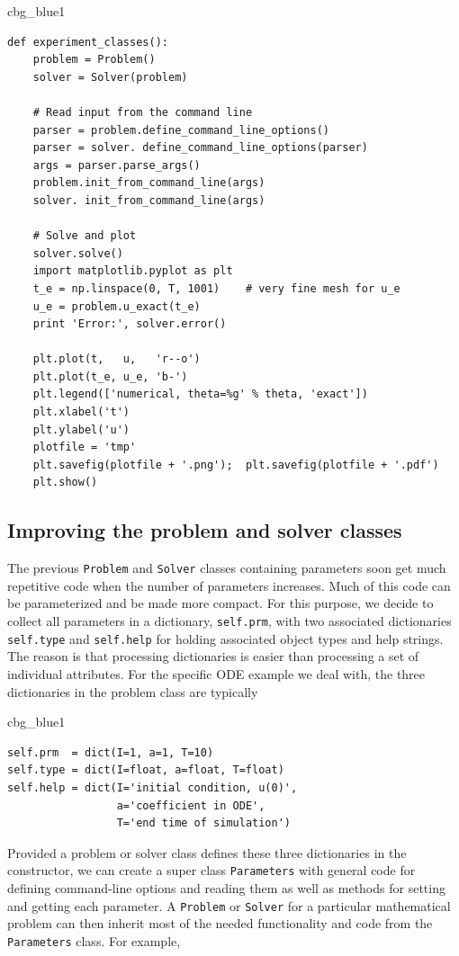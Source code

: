 \documentclass[%
oneside,                 %
final,                   %
10pt]{article}
\newenvironment{_cod_tight}[1]{
   \def\FrameCommand{\colorbox{#1}}
   \FrameRule0.6pt\MakeFramed {\FrameRestore}\vskip3mm}
   {\vskip0mm\endMakeFramed}
\newenvironment{cod}[1]{
\bgroup\rmfamily
\fboxsep=0mm\relax
\begin{_cod_tight}{#1}
\list{}{\parsep=-2mm\parskip=0mm\topsep=0pt\leftmargin=2mm
\rightmargin=2\leftmargin\leftmargin=4pt\relax}
\item\relax}
{\endlist\end{_cod_tight}\egroup}
\begin{document}
\begin{cod}{cbg_blue1}\begin{Verbatim}[numbers=none,fontsize=\fontsize{9pt}{9pt},baselinestretch=0.95,xleftmargin=2mm]
def experiment_classes():
    problem = Problem()
    solver = Solver(problem)

    # Read input from the command line
    parser = problem.define_command_line_options()
    parser = solver. define_command_line_options(parser)
    args = parser.parse_args()
    problem.init_from_command_line(args)
    solver. init_from_command_line(args)

    # Solve and plot
    solver.solve()
    import matplotlib.pyplot as plt
    t_e = np.linspace(0, T, 1001)    # very fine mesh for u_e
    u_e = problem.u_exact(t_e)
    print 'Error:', solver.error()

    plt.plot(t,   u,   'r--o')
    plt.plot(t_e, u_e, 'b-')
    plt.legend(['numerical, theta=%g' % theta, 'exact'])
    plt.xlabel('t')
    plt.ylabel('u')
    plotfile = 'tmp'
    plt.savefig(plotfile + '.png');  plt.savefig(plotfile + '.pdf')
    plt.show()
\end{Verbatim}
\end{cod}
\noindent


\subsection{Improving the problem and solver classes}
\label{softeng1:prog:se:class2}

The previous \texttt{Problem} and \texttt{Solver} classes containing parameters
soon get much repetitive code when the number of parameters increases.
Much of this code can be parameterized and be made more compact.
For this purpose, we decide to collect all parameters in a dictionary,
\texttt{self.prm}, with two associated dictionaries \texttt{self.type} and
\texttt{self.help} for holding associated object types and help strings.
The reason is that processing dictionaries is easier than processing
a set of individual attributes.
For the specific ODE example we deal with, the three dictionaries in
the problem class are typically

\begin{cod}{cbg_blue1}\begin{Verbatim}[numbers=none,fontsize=\fontsize{9pt}{9pt},baselinestretch=0.95,xleftmargin=2mm]
self.prm  = dict(I=1, a=1, T=10)
self.type = dict(I=float, a=float, T=float)
self.help = dict(I='initial condition, u(0)',
                 a='coefficient in ODE',
                 T='end time of simulation')
\end{Verbatim}
\end{cod}
\noindent
Provided a problem or solver class defines these three
dictionaries in the constructor,
we can create a super class \texttt{Parameters} with general code
for defining command-line options and reading them as well as
methods for setting and getting each parameter. A \texttt{Problem} or \texttt{Solver} for
a particular mathematical problem can then
inherit most of the needed functionality and code
from the \texttt{Parameters} class. For example,
\end{document}
